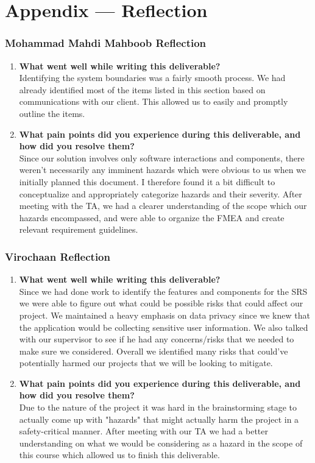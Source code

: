 \documentclass[12pt]{article}
\begin{document}
\newpage{}

\section*{Appendix --- Reflection}
% 
\subsubsection*{Mohammad Mahdi Mahboob Reflection}
\begin{enumerate}
    \item {\bf What went well while writing this deliverable?}\\
        Identifying the system boundaries was a fairly smooth process. We had already identified most of the items
        listed in this section based on communications with our client. This allowed us to easily and promptly outline
        the items.
    \item {\bf What pain points did you experience during this deliverable, and how did you resolve them?}\\
        Since our solution involves only software interactions and components, there weren't necessarily any imminent
        hazards which were obvious to us when we initially planned this document. I therefore found it a bit difficult
        to conceptualize and appropriately categorize hazards and their severity. After meeting with the TA, we
        had a clearer understanding of the scope which our hazards encompassed, and were able to organize the FMEA and
        create relevant requirement guidelines.
\end{enumerate}

\subsubsection*{Virochaan Reflection}
\begin{enumerate}
    \item \textbf{What went well while writing this deliverable?} \\
    Since we had done work to identify the features and components for the SRS we were able to figure out what could be possible risks that could affect our project. We maintained a heavy emphasis on data privacy since we knew that the application would be collecting sensitive user information. We also talked with our supervisor to see if he had any concerns/risks that we needed to make sure we considered. Overall we identified many risks that could've potentially harmed our projects that we will be looking to mitigate.
    \item \textbf{What pain points did you experience during this deliverable, and how did you resolve them?} \\
    Due to the nature of the project it was hard in the brainstorming stage to actually come up with "hazards" that might actually harm the project in a safety-critical manner. After meeting with our TA we had a better understanding on what we would be considering as a hazard in the scope of this course which allowed us to finish this deliverable.
\end{enumerate}
\end{document}
